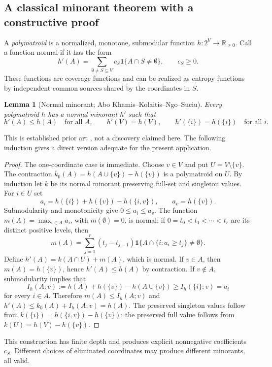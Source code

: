 \documentclass[11pt,a4paper]{article}
\newtheorem{lemma}[theorem]{Lemma}
\theoremstyle{definition}\newtheorem{definition}[theorem]{Definition}
\theoremstyle{remark}\newtheorem{remark}[theorem]{Remark}
\newcommand{\R}{\mathbb R}\newcommand{\C}{\mathbb C}\newcommand{\N}{\mathbb N}
\numberwithin{equation}{section}
\begin{document}
\subsection{A classical minorant theorem with a constructive proof}\label{R05-sec-2}
A \emph{polymatroid} is a normalized, monotone, submodular function $h:2^V\to\R_{\geq0}$. Call a function normal if it has the form
\begin{equation}\label{R05-normal}
h'(A)=\sum_{\emptyset\ne S\subseteq V}c_S\mathbf1\{A\cap S\ne\emptyset\},\qquad c_S\geq0.
\end{equation}
These functions are coverage functions and can be realized as entropy functions by independent common sources shared by the coordinates in $S$.
\begin{lemma}[Normal minorant; Abo Khamis--Kolaitis--Ngo--Suciu]\label{R05-minorant}
Every polymatroid $h$ has a normal minorant $h'$ such that
\[
h'(A)\leq h(A)\quad\text{for all }A,\qquad
h'(V)=h(V),\qquad h'(\{i\})=h(\{i\})\quad\text{for all }i.
\]
\end{lemma}
This is established prior art \cite[Lemma 3.10]{ref067}, not a discovery claimed here. The following induction gives a direct version adequate for the present application.
\begin{proof}
The one-coordinate case is immediate. Choose $v\in V$ and put $U=V\setminus\{v\}$. The contraction
$k_0(A)=h(A\cup\{v\})-h(\{v\})$ is a polymatroid on $U$. By induction let $k$ be its normal minorant preserving full-set and singleton values. For $i\in U$ set
\[
a_i=h(\{i\})+h(\{v\})-h(\{i,v\}),\qquad a_v=h(\{v\}).
\]
Submodularity and monotonicity give $0\leq a_i\leq a_v$. The function $m(A)=\max_{i\in A}a_i$, with $m(\emptyset)=0$, is normal: if $0=t_0<t_1<\cdots<t_r$ are its distinct positive levels, then
\[
m(A)=\sum_{j=1}^r(t_j-t_{j-1})\mathbf1\{A\cap\{i:a_i\geq t_j\}\ne\emptyset\}.
\]
Define $h'(A)=k(A\cap U)+m(A)$, which is normal. If $v\in A$, then $m(A)=h(\{v\})$, hence $h'(A)\leq h(A)$ by contraction. If $v\notin A$, submodularity implies that
\[
I_h(A;v):=h(A)+h(\{v\})-h(A\cup\{v\})\geq I_h(\{i\};v)=a_i
\]
for every $i\in A$. Therefore $m(A)\leq I_h(A;v)$ and
$h'(A)\leq k_0(A)+I_h(A;v)=h(A)$.
The preserved singleton values follow from $k(\{i\})=h(\{i,v\})-h(\{v\})$; the preserved full value follows from $k(U)=h(V)-h(\{v\})$.
\end{proof}
This construction has finite depth and produces explicit nonnegative coefficients $c_S$. Different choices of eliminated coordinates may produce different minorants, all valid.
\end{document}
